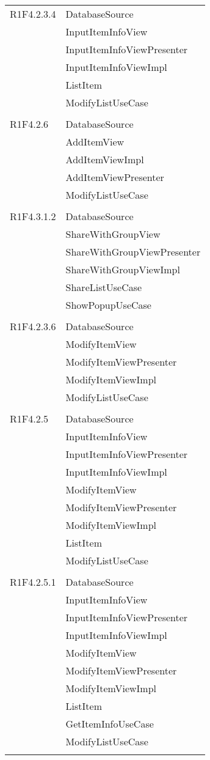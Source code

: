 \begin{center}
\begin{longtable}{|p{7cm}|p{7cm}|}
		R1F4.2.3.4 & DatabaseSource \\ & InputItemInfoView \\ & InputItemInfoViewPresenter \\ & InputItemInfoViewImpl \\ & ListItem \\ & ModifyListUseCase \\ & \\ \hline
		R1F4.2.6 & DatabaseSource \\ & AddItemView \\ & AddItemViewImpl \\ & AddItemViewPresenter \\ & ModifyListUseCase \\ & \\ \hline
		R1F4.3.1.2 & DatabaseSource \\ & ShareWithGroupView \\ & ShareWithGroupViewPresenter \\ & ShareWithGroupViewImpl \\ & ShareListUseCase \\ & ShowPopupUseCase \\ & \\ \hline
		R1F4.2.3.6 & DatabaseSource \\ & ModifyItemView \\ & ModifyItemViewPresenter \\ & ModifyItemViewImpl \\ & ModifyListUseCase \\ & \\ \hline
		R1F4.2.5 & DatabaseSource \\ & InputItemInfoView \\ & InputItemInfoViewPresenter \\ & InputItemInfoViewImpl \\ & ModifyItemView \\ & ModifyItemViewPresenter \\ & ModifyItemViewImpl \\ & ListItem \\ & ModifyListUseCase \\ & \\ \hline
		R1F4.2.5.1 & DatabaseSource \\ & InputItemInfoView \\ & InputItemInfoViewPresenter \\ & InputItemInfoViewImpl \\ & ModifyItemView \\ & ModifyItemViewPresenter \\ & ModifyItemViewImpl \\ & ListItem \\ & GetItemInfoUseCase \\ & ModifyListUseCase \\ & \\ \hline

\end{longtable}
\end{center}
